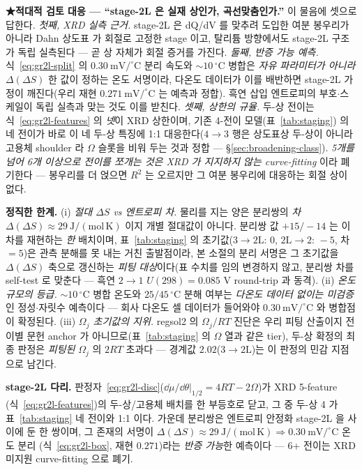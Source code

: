 \medskip
\textbf{★적대적 검토 대응 --- ``stage-2L 은 실재 상인가, 곡선맞춤인가.''} 이 물음에 셋으로 답한다.
\emph{첫째, XRD 실측 근거.} stage-2L 은 dQ/dV 를 맞추려 도입한 여분 봉우리가 아니라 Dahn 상도표\cite{dahn1991}
가 회절로 고정한 stage 이고, 탈리튬 방향에서도 stage-2L 구조가 독립 실측된다\cite{schmitt2022} --- 곧 상 자체가
회절 증거를 가진다. \emph{둘째, 반증 가능 예측.} 식~\eqref{eq:gr2l-split} 의 $0.30\ \mathrm{mV/^\circ C}$ 분리
속도와 $\sim10\,^\circ$C 병합은 \emph{자유 파라미터가 아니라} $\Delta(\Delta S)$ 한 값이 정하는 온도 서명이라,
다온도 데이터가 이를 배반하면 stage-2L 가정이 깨진다(우리 재현 $0.271\ \mathrm{mV/^\circ C}$ 는 예측과 정합).
흑연 삽입 엔트로피의 부호$\cdot$스케일이 독립 실측과 맞는 것도 이를 받친다\cite{reynier2003}. \emph{셋째, 상한의
규율.} 두-상 전이는 식~\eqref{eq:gr2l-features} 의 \emph{넷}이 XRD 상한이며, 기존 4-전이 모델(표~\ref{tab:staging})
의 네 전이가 바로 이 네 두-상 특징에 1:1 대응한다($4\!\to\!3$ 행은 상도표상 두-상이 아니라 고용체 shoulder 라
$\Omega$ 슬롯을 비워 두는 것과 정합 --- \S\ref{sec:broadening-class}). \emph{5개를 넘어 6개 이상으로 전이를
쪼개는 것은 XRD 가 지지하지 않는 curve-fitting} 이라 폐기한다 --- 봉우리를 더 얹으면 $R^2$ 는 오르지만 그
여분 봉우리에 대응하는 회절 상이 없다.

\begin{warnbox}
\textbf{정직한 한계.} (i) \emph{절대 $\Delta S$ vs 엔트로피 \emph{차}.} 물리를 지는 양은 분리쌍의 \emph{차}
$\Delta(\Delta S)\approx29\ \mathrm{J/(mol\,K)}$ 이지 개별 절대값이 아니다. 분리쌍 값 $+15/-14$ 는 이 차를
재현하는 \emph{한} 배치이며, 표~\ref{tab:staging} 의 초기값($3\!\to\!2\mathrm L{:}\,0$, $2\mathrm L\!\to\!2{:}\,-5$,
차 $=5$)은 관측 분해를 못 내는 거친 출발점이라, 본 소절의 분리 서명은 그 초기값을 $\Delta(\Delta S)$ 축으로
갱신하는 \emph{피팅 대상}이다(표 수치를 임의 변경하지 않고, 분리쌍 차를 self-test 로 맞춘다 --- 흑연 $2\!\to\!1$
$U(298){=}0.085$ V round-trip 과 동격). (ii) \emph{온도 규모의 등급.} $\sim10\,^\circ$C 병합 온도와
$25/45\,^\circ$C 분해 여부는 \emph{다온도 데이터 없이는 미검증}인 정성$\cdot$자릿수 예측이다 --- 회사 다온도
셀 데이터가 들어와야 $0.30\ \mathrm{mV/^\circ C}$ 와 병합점이 확정된다. (iii) \emph{$\Omega_j$ 초기값의 지위.}
regsol2 의 $\Omega_j/RT$ 진단은 우리 피팅 산출이지 전이별 문헌 anchor 가 아니므로(표~\ref{tab:staging} 의
$\Omega$ 열과 같은 tier), 두-상 확정의 최종 판정은 \emph{피팅된} $\Omega_j$ 의 $2RT$ 초과다 --- 경계값
$2.02$($3\!\to\!2\mathrm L$)는 이 판정의 민감 지점으로 남긴다.
\end{warnbox}

\begin{keybox}
\textbf{stage-2L 다리.} 판정자~\eqref{eq:gr2l-disc}($\dd\mu/\dd\theta|_{1/2}=4RT-2\Omega$)가 XRD 5-feature
(식~\eqref{eq:gr2l-features})의 두-상/고용체 배치를 한 부등호로 닫고, 그 중 두-상 4 가 표~\ref{tab:staging}
네 전이와 1:1 이다. 가운데 분리쌍은 엔트로피 안정화 stage-2L 을 사이에 둔 한 쌍이며, 그 존재의 서명이
$\Delta(\Delta S)\approx29\ \mathrm{J/(mol\,K)}\Rightarrow0.30\ \mathrm{mV/^\circ C}$ 온도 분리
(식~\eqref{eq:gr2l-box}, 재현 $0.271$)라는 \emph{반증 가능}한 예측이다 --- 6+ 전이는 XRD 미지원 curve-fitting 으로 폐기.
\end{keybox}

